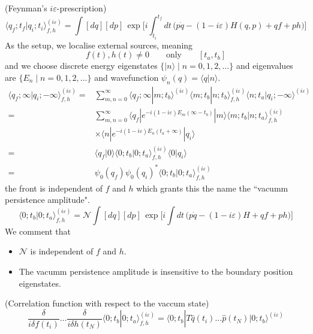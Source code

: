 \begin{thm}
(Feynman's $i\varepsilon $-prescription) 
\[\langle q_{f};t_{f}|q_{i};t_{i}\rangle ^{(i\varepsilon )}_{f,h}=\int [dq][dp]\,\exp \Big[i\int ^{t_{f}}_{t_{i}}dt\,\Big(p\dot{q}-(1-i\varepsilon )H(q,p)+qf+ph\Big)\Big]\]
As the setup, we localise external sources, meaning
\[f(t),h(t)\ne 0\qquad\mathrm{only}\qquad [t_{a},t_{b}]\]
and we choose discrete energy eigenstates $\{|n\rangle\; |\;n=0,1,2,\ldots \}$ and eigenvalues are $\{E_{n}\;|\;n=0,1,2,\ldots \}$ and wavefunction $\psi _{n}(q)=\langle q|n\rangle $. 
\[\begin{align*}
\langle q_{f};\infty |q_{i};-\infty \rangle ^{(i\varepsilon )}_{f,h}=&\sum ^{\infty }_{m,n=0}\langle q_{f};\infty |m;t_{b}\rangle ^{(i\varepsilon )}\langle m;t_{b}|n;t_{b}\rangle ^{(i\varepsilon )}_{f,h}\langle n;t_{a}|q_{i};-\infty \rangle ^{(i\varepsilon )}\\
=&\sum ^{\infty }_{m,n=0}\langle q_{f}|e^{-i(1-i\varepsilon )E_{m}(\infty -t_{b})}|m\rangle \langle m;t_{b}|n;t_{a}\rangle ^{(i\varepsilon )}_{f,h}\\
&\times \langle n|e^{-i(1-i\varepsilon )E_{n}(t_{a}+\infty )}|q_{i}\rangle \\
=&\langle q_{f}|0\rangle \langle 0;t_{b}|0;t_{a}\rangle ^{(i\varepsilon )}_{f,h}\langle 0|q_{i}\rangle \\
=&\psi _{0}(q_{f})\psi _{0}(q_{i})^{*}\langle 0;t_{b}|0;t_{a}\rangle ^{(i\varepsilon )}_{f,h}
\end{align*}\]
the front is independent of $f$ and $h$ which grants this the name the ``vacumm persistence amplitude".
\[\langle 0;t_{b}|0;t_{a}\rangle ^{(i\varepsilon )}_{f,h}=\mathcal{N}\int [dq][dp]\,\exp \Big[i\int dt\,\Big(p\dot{q}-(1-i\varepsilon )H+qf+ph\Big)\Big]\]
We comment that
\begin{itemize}
\item[(i)] $\mathcal{N}$ is independent of $f$ and $h$.
\item[(ii)] The vacumm persistence amplitude is insensitive to the boundary position eigenstates. 
\end{itemize}
\end{thm}
\vspace{2ex}
\begin{cor}
(Correlation function with respect to the vaccum state) 
\[\dfrac{\delta }{i\delta f(t_{i})}\ldots \dfrac{\delta }{i\delta h(t_{N})}\langle 0;t_{b}|0;t_{a}\rangle ^{(i\varepsilon )}_{f,h}=\langle 0;t_{b}|T\hat{q}(t_{i})\ldots \hat{p}(t_{N})|0;t_{b}\rangle ^{(i\varepsilon )}\]
\end{cor}
\vspace{2ex}

